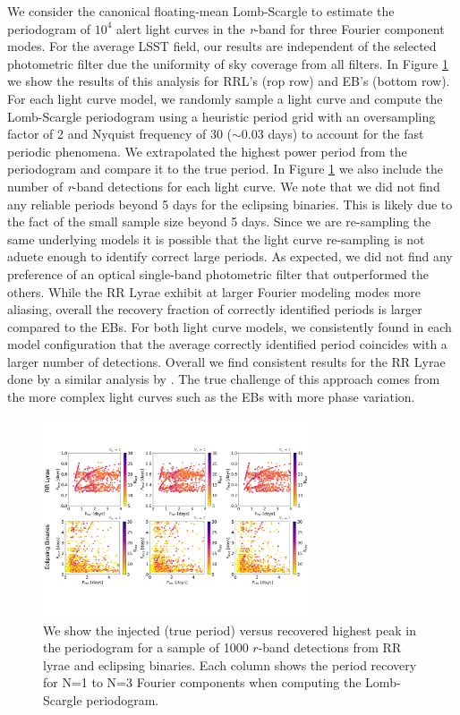 \documentclass[DM,authoryear,toc]{lsstdoc}
\begin{document}
We consider the canonical floating-mean Lomb-Scargle to estimate the periodogram of $10^4$ alert light curves in the \textit{r}-band for three Fourier component modes.
For the average LSST field, our results are independent of the selected photometric filter due the uniformity of sky coverage from all filters.
In Figure \ref{fig:single_band_lsp} we show the results of this analysis for RRL's (rop row) and EB's (bottom row).
For each light curve model, we randomly sample a light curve and compute the Lomb-Scargle periodogram using a heuristic period grid with an oversampling factor of 2 and Nyquist frequency of 30 ($\sim$0.03 days) to account for the fast periodic phenomena.
We extrapolated the highest power period from the periodogram and compare it to the true period.
In Figure \ref{fig:single_band_lsp} we also include the number of \textit{r}-band detections for each light curve.
We note that we did not find any reliable periods beyond 5 days for the eclipsing binaries.
This is likely due to the fact of the small sample size beyond 5 days.
Since we are re-sampling the same underlying models it is possible that the light curve re-sampling is not aduete enough to identify correct large periods.
As expected, we did not find any preference of an optical single-band photometric filter that outperformed the others.
While the RR Lyrae exhibit at larger Fourier modeling modes more aliasing, overall the recovery fraction of correctly identified periods is larger compared to the EBs.
For both light curve models, we consistently found in each model configuration that the average correctly identified period coincides with a larger number of detections.
Overall we find consistent results for the RR Lyrae done by a similar analysis by \citet{VanderPlas:VP2015}.
The true challenge of this approach comes from the more complex light curves such as the EBs with more phase variation.


\begin{figure}
  \includegraphics[width=0.7\textwidth]{figures/singleband_lsp.pdf}
  \centering 
  \caption{We show the injected (true period) versus recovered highest peak in the periodogram for a sample of 1000 $r$-band detections from RR lyrae and eclipsing binaries.
Each column shows the period recovery for N=1 to N=3 Fourier components when computing the Lomb-Scargle periodogram.}
  \label{fig:single_band_lsp}
\end{figure}
\end{document}
